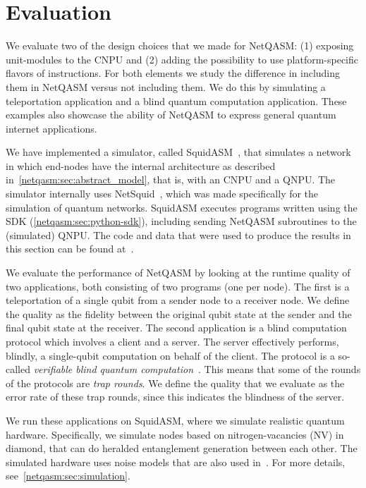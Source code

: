 \section{Evaluation}
\label{netqasm:sec:evaluation}
We evaluate two of the design choices that we made for \ac{NetQASM}:
    (1) exposing unit-modules to the \ac{CNPU} and
    (2) adding the possibility to use platform-specific flavors of instructions.
For both elements we study the difference in including them in \ac{NetQASM} versus not including them.
We do this by simulating a teleportation application and a blind quantum computation application.
These examples also showcase the ability of \ac{NetQASM} to express general quantum internet applications.

We have implemented a simulator, called SquidASM~\cite{git_squidasm}, that simulates a network in which end-nodes have the internal architecture as described in~\cref{netqasm:sec:abstract_model}, that is, with an \ac{CNPU} and a \ac{QNPU}.
The simulator internally uses NetSquid~\cite{netsquid}, which was made specifically for the simulation of quantum networks.
SquidASM executes programs written using the SDK (\cref{netqasm:sec:python-sdk}), including sending \ac{NetQASM} subroutines to the (simulated) \ac{QNPU}.
The code and data that were used to produce the results in this section can be found at~\cite{git_netqasm_paper_data}.

We evaluate the performance of \ac{NetQASM} by looking at the runtime quality of two applications, both consisting of two programs (one per node).
The first is a teleportation of a single qubit from a sender node to a receiver node.
We define the quality as the fidelity between the original qubit state at the sender and the final qubit state at the receiver.
The second application is a blind computation protocol which involves a client and a server.
The server effectively performs, blindly, a single-qubit computation on behalf of the client.
The protocol is a so-called \textit{verifiable blind quantum computation}~\cite{fitzsimons2017unconditionally}.
This means that some of the rounds of the protocols are \textit{trap rounds}.
We define the quality that we evaluate as the error rate of these trap rounds, since this indicates the blindness of the server.

We run these applications on SquidASM, where we simulate realistic quantum hardware.
Specifically, we simulate nodes based on nitrogen-vacancies (NV) in diamond, that can do heralded entanglement generation between each other.
The simulated hardware uses noise models that are also used in~\cite{coopmans2021netsquid}.
For more details, see~\cref{netqasm:sec:simulation}.

